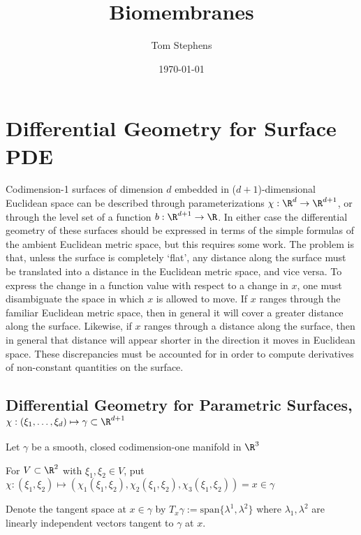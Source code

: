 \documentclass[10pt]{article}
\title{Biomembranes}
\author{Tom Stephens}
\date{ \today}
\begin{document}
\maketitle



\section{Differential Geometry for Surface PDE}

Codimension-1 surfaces of dimension $d$ embedded in ($d+1$)-dimensional
Euclidean space can be described through parameterizations $\chi: \R^d \to
\R^{d+1}$, or through the level set of a function $b: \R^{d+1} \to \R$.  In
either case the differential geometry of these surfaces should be expressed in
terms of the simple formulas of the ambient Euclidean metric space, but this
requires some work.  The problem is that, unless the surface is completely
`flat', any distance along the surface must be translated into a distance in
the Euclidean metric space, and vice versa. To express the change in a function
value with respect to a change in $x$, one must disambiguate the space in which
$x$ is allowed to move. If $x$ ranges through the familiar Euclidean metric
space, then in general it will cover a greater distance along the surface.
Likewise, if $x$ ranges through a distance along the surface, then in general
that distance will appear shorter in the direction it moves in Euclidean space.
These discrepancies must be accounted for in order to compute derivatives of
non-constant quantities on the surface.  



\subsection{Differential Geometry for Parametric Surfaces, $\chi : (\xi_1, \ldots,
   \xi_d) \mapsto \gamma \subset \R^{d+1}$}

Let $\gamma$ be a smooth, closed codimension-one manifold in $\R^3$ 

For $V \subset \R^2$ with $\xi_1,\xi_2 \in V$, put  $\chi : (\xi_1,\xi_2)
\mapsto \left( \chi_1(\xi_1,\xi_2), \chi_2(\xi_1,\xi_2), \chi_3(\xi_1,\xi_2)
\right) = x \in \gamma$

Denote the tangent space at $x \in \gamma$ by $T_x {\gamma} := \text{span}
\{ \lambda^1, \lambda^2\}$ where $\lambda_1,\lambda^2$ are linearly independent
vectors tangent to $\gamma$ at $x$.
\end{document}
